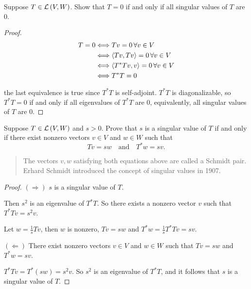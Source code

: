 \begin{exercise}
    Suppose $T\in \mathcal{L}\left({V, W}\right)$. Show that $T = 0$ if and only if all singular values of $T$ are $0$.
\end{exercise}

\begin{proof}
    \begin{align*}
        T = 0 & \Longleftrightarrow Tv = 0\,\forall v\in V                     \\
              & \Longleftrightarrow \left\langle{Tv, Tv}\right\rangle = 0\,\forall v\in V     \\
              & \Longleftrightarrow \left\langle{T^{*}Tv, v}\right\rangle = 0\,\forall v\in V \\
              & \Longleftrightarrow T^{*}T = 0
    \end{align*}

    the last equivalence is true since $T^{*}T$ is self-adjoint. $T^{*}T$ is diagonalizable, so $T^{*}T = 0$ if and only if all eigenvalues of $T^{*}T$ are $0$, equivalently, all singular values of $T$ are $0$.
\end{proof}
\newpage

\begin{exercise}
    Suppose $T\in \mathcal{L}\left({V, W}\right)$ and $s > 0$. Prove that $s$ is a singular value of $T$ if and only if there exist nonzero vectors $v \in V$ and $w \in W$ such that
    \[
        Tv = sw \quad\text{and}\quad T^{*}w = sv.
    \]
\end{exercise}

\begin{quote}
    The vectors $v, w$ satisfying both equations above are called a Schmidt pair. Erhard Schmidt introduced the concept of singular values in 1907.
\end{quote}

\begin{proof}
    $(\Rightarrow)$ $s$ is a singular value of $T$.

    Then $s^{2}$ is an eigenvalue of $T^{*}T$. So there exists a nonzero vector $v$ such that $T^{*}Tv = s^{2}v$.

    Let $w = \frac{1}{s}Tv$, then $w$ is nonzero, $Tv = sw$ and $T^{*}w = \frac{1}{s}T^{*}Tv = sv$.

    \bigskip
    $(\Leftarrow)$ There exist nonzero vectors $v \in V$ and $w \in W$ such that $Tv = sw$ and $T^{*}w = sv$.

    $T^{*}Tv = T^{*}(sw) = s^{2}v$. So $s^{2}$ is an eigenvalue of $T^{*}T$, and it follows that $s$ is a singular value of $T$.
\end{proof}
\newpage

